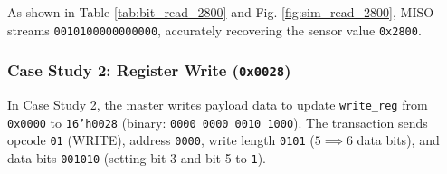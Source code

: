 \documentclass[conference]{IEEEtran}
\begin{document}
\begin{table}[htbp]
\caption{Bit-by-Bit Breakdown for Sensor Read Transaction (\texttt{0x2800})}
\label{tab:bit_read_2800}
\centering
{}
\end{table}

As shown in Table \ref{tab:bit_read_2800} and Fig. \ref{fig:sim_read_2800}, MISO streams \texttt{0010100000000000}, accurately recovering the sensor value \texttt{0x2800}.

\subsubsection{Case Study 2: Register Write (\texttt{0x0028})}
In Case Study 2, the master writes payload data to update \texttt{write\_reg} from \texttt{0x0000} to \texttt{16'h0028} (binary: \texttt{0000 0000 0010 1000}). The transaction sends opcode \texttt{01} (WRITE), address \texttt{0000}, write length \texttt{0101} ($5 \implies 6$ data bits), and data bits \texttt{001010} (setting bit 3 and bit 5 to \texttt{1}).
\end{document}
